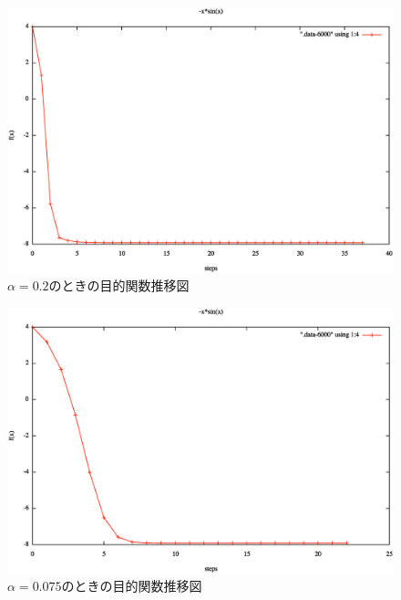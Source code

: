 \begin{minipage}{0.5\hsize}
    \begin{figure}[H]
        \begin{center}
            \includegraphics[scale=0.25]{./figs/sim-6000-0_2.eps}
            \caption{$\alpha=0.2$のときの目的関数推移図}
            \label{fig:sim-6000-0.2}
        \end{center}
    \end{figure}
\end{minipage}
\begin{minipage}{0.4\hsize}
    \begin{figure}[H]
        \begin{center}
            \includegraphics[scale=0.25]{./figs/sim-6000-0_075.eps}
            \caption{$\alpha=0.075$のときの目的関数推移図}
            \label{fig:sim-6000-0.075}
        \end{center}
    \end{figure}
\end{minipage}
